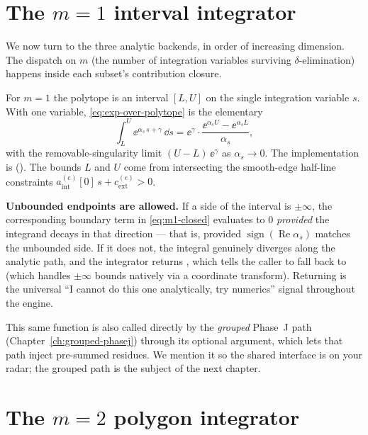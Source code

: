 \section{The $m=1$ interval integrator}\label{sec:m1}

We now turn to the three analytic backends, in order of increasing dimension.
The dispatch on $m$ (the number of integration variables surviving
$\delta$-elimination) happens inside each subset's contribution closure.

For $m=1$ the polytope is an interval $[L, U]$ on the single integration variable
$s$. With one variable, \eqref{eq:exp-over-polytope} is the elementary
\begin{equation}
  \int_L^U \ee^{\alpha_s\, s + \gamma}\,\dd s
   = \ee^{\gamma}\cdot\frac{\ee^{\alpha_s U} - \ee^{\alpha_s L}}{\alpha_s},
  \label{eq:m1-closed}
\end{equation}
with the removable-singularity limit $(U-L)\,\ee^{\gamma}$ as $\alpha_s\to 0$. The
implementation is 
(). The bounds $L$ and $U$ come from intersecting
the smooth-edge half-line constraints $a^{(e)}_{\text{int}}[0]\,s + c_{\text{ext}}^{(e)} > 0$.

\begin{note}
\textbf{Unbounded endpoints are allowed.} If a side of the interval is $\pm\infty$,
the corresponding boundary term in \eqref{eq:m1-closed} evaluates to $0$
\emph{provided} the integrand decays in that direction --- that is, provided
$\operatorname{sign}(\operatorname{Re}\alpha_s)$ matches the unbounded side. If it
does not, the integral genuinely diverges along the analytic path, and the
integrator returns , which tells the caller to fall back to
 (which handles $\pm\infty$ bounds natively via a coordinate
transform). Returning  is the universal ``I cannot do this one
analytically, try numerics'' signal throughout the engine.
\end{note}

This same function is also called directly by the \emph{grouped} Phase~J path
(Chapter~\ref{ch:grouped-phasej}) through its optional 
argument, which lets that path inject pre-summed residues. We mention it so the
shared interface is on your radar; the grouped path is the subject of the next
chapter.

\section{The $m=2$ polygon integrator}\label{sec:m2}

